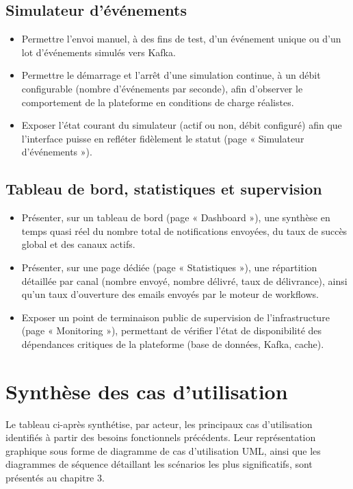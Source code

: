 \documentclass[12pt,a4paper]{report}
\begin{document}
\subsection{Simulateur d'événements}

\begin{itemize}
  \item Permettre l'envoi manuel, à des fins de test, d'un événement unique ou d'un lot d'événements simulés vers Kafka.
  \item Permettre le démarrage et l'arrêt d'une simulation continue, à un débit configurable (nombre d'événements par seconde), afin d'observer le comportement de la plateforme en conditions de charge réalistes.
  \item Exposer l'état courant du simulateur (actif ou non, débit configuré) afin que l'interface puisse en refléter fidèlement le statut (page « Simulateur d'événements »).
\end{itemize}

\subsection{Tableau de bord, statistiques et supervision}

\begin{itemize}
  \item Présenter, sur un tableau de bord (page « Dashboard »), une synthèse en temps quasi réel du nombre total de notifications envoyées, du taux de succès global et des canaux actifs.
  \item Présenter, sur une page dédiée (page « Statistiques »), une répartition détaillée par canal (nombre envoyé, nombre délivré, taux de délivrance), ainsi qu'un taux d'ouverture des emails envoyés par le moteur de workflows.
  \item Exposer un point de terminaison public de supervision de l'infrastructure (page « Monitoring »), permettant de vérifier l'état de disponibilité des dépendances critiques de la plateforme (base de données, Kafka, cache).
\end{itemize}

\section{Synthèse des cas d'utilisation}

Le tableau ci-après synthétise, par acteur, les principaux cas d'utilisation identifiés à partir des besoins fonctionnels précédents. Leur représentation graphique sous forme de diagramme de cas d'utilisation UML, ainsi que les diagrammes de séquence détaillant les scénarios les plus significatifs, sont présentés au chapitre 3.
\end{document}
